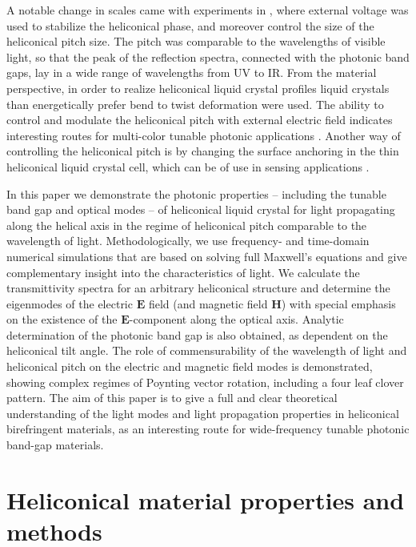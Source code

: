 \documentclass{osa-article}
\renewcommand{\vec}[1]{\mathbf{#1}}
\begin{document}
A notable change in scales came with experiments in \cite{XiangJ_AdvMater27_2015}, where external voltage was used to stabilize the heliconical phase, 
and moreover control the size of the heliconical pitch size.
The pitch was comparable to the wavelengths of visible light, so that the peak of the reflection spectra, 
connected with the photonic band gaps, lay in a wide range of wavelengths from UV to IR.
From the material perspective, in order to realize heliconical liquid crystal profiles liquid crystals than energetically prefer bend to twist deformation were used. 
The ability to control and modulate the heliconical pitch with external electric field indicates interesting routes for multi-color tunable photonic applications \cite{XiangJ_ProcNatlAcadSci113_2016}.
Another way of controlling the heliconical pitch is by changing the surface anchoring in the thin heliconical liquid crystal cell, 
which can be of use in sensing applications \cite{IadlovskaOS_OptLett43_2018}. 

In this paper we demonstrate the photonic properties -- including the tunable band gap and optical modes -- of heliconical liquid crystal 
for light propagating along the helical axis in the regime of heliconical pitch comparable to the wavelength of light. 
Methodologically, we use frequency- and time-domain numerical simulations that are based on solving full Maxwell's equations 
and give complementary insight into the characteristics of light. 
We calculate the transmittivity spectra for an arbitrary heliconical structure and determine the eigenmodes of the electric $\vec{E}$ field 
(and magnetic field $\vec{H}$) with special emphasis on the existence of the $\vec{E}$-component along the optical axis. 
Analytic determination of the photonic band gap is also obtained, as dependent on the heliconical tilt angle. 
The role of commensurability of the wavelength of light and heliconical pitch on the electric and magnetic field modes is demonstrated, 
showing complex regimes of Poynting vector rotation, including a four leaf clover pattern. 
The aim of this paper is to give a full and clear theoretical understanding of the light modes and light propagation properties in heliconical birefringent materials, 
as an interesting route for wide-frequency tunable photonic band-gap materials.  


\section{Heliconical material properties and methods}
\end{document}
